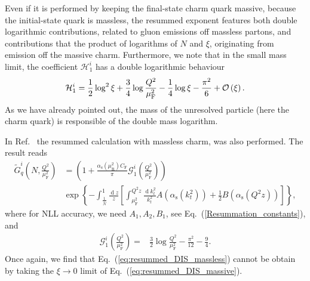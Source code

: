 \documentclass[letterpaper,11pt]{article}
\newcommand{\as}{\alpha_\text{s}}
\newcommand{\cf}{C_{\text{F}}}
\newcommand{\order}[1]{{\cal O}\left(#1\right)}
\DeclareMathOperator{\De}{d}
\newcommand{\de}{\De\!}
\newcommand{\muf}{\mu_{\text{F}}}
\newcommand{\mur}{\mu_{\text{R}}}
\begin{document}
%
Even if it is performed by keeping the final-state charm quark massive, because the initial-state quark is massless, the resummed exponent features both double logarithmic contributions, related to gluon emissions off massless partons, and contributions that the product of logarithms of $N$ and $\xi$, originating from emission off the massive charm.
%
Furthermore, we note that in the small mass limit, the coefficient $\mathcal{H}^i_1$ has a double logarithmic behaviour
\begin{equation}
\mathcal{H}^i_1=\frac{1}{2}\log^2{\xi} +\frac{3}{4} \log \frac{Q^2}{\muf^2}-\frac{1}{4} \log \xi -\frac{\pi^2}{6}
 +\order{\xi}.
\end{equation}
As we have already pointed out, the mass of the unresolved particle (here the charm quark) is responsible of the double mass logarithm. 
%


In Ref.~\cite{Corcella:2003ib} the resummed calculation with massless charm, was also performed. The result reads
\begin{align}\label{eq:resummed_DIS_massless}
\widetilde{G}^{i}_q\left(N,\frac{Q^2}{\muf^2}\right)&
=\left(1+ \frac{\as(\mur^2)\cf }{\pi}\mathcal{G}^i_1\left(\frac{Q^2}{\muf^2}\right)\right) \nonumber \\
&
\exp\left\{-\int^{1}_{{\frac{1}{ \bar N}}} \frac{\de z}{z} \left[\int^{Q^2 z}_{\muf^2} \frac{\de k_t^2}{k_t^2} A\left(\as(k_t^2)\right)+\frac{1}{2} B\left(\as\left(Q^2z\right)\right)\right]\right\},
\end{align}
where for NLL accuracy, we need $A_1,A_2,B_1$, see Eq.~(\ref{Resummation_constants}), and
\begin{align}
		\mathcal{G}^i_1\left(\frac{Q^2}{\muf^2}\right)=& \frac{3}{2} \log \frac{Q^2}{\muf^2}-\frac{\pi^2}{12}-\frac{9}{4}.
\end{align}
Once again, we find that Eq.~(\ref{eq:resummed_DIS_massless}) cannot be obtain by taking the $\xi \to 0$ limit of Eq.~(\ref{eq:resummed_DIS_massive}).
\end{document}
